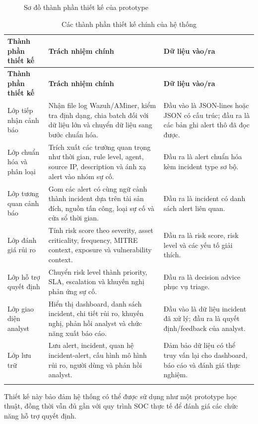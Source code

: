 \documentclass[a4paper,12pt,oneside]{book}
\begin{document}
{\begin{figure}[H]
{
}
\caption{Sơ đồ thành phần thiết kế của prototype}
\label{fig:deployment-diagram}
\end{figure}

\begin{longtable}{|L{3.5cm}|L{5.2cm}|L{5.1cm}|}
\hline
\textbf{Thành phần thiết kế} & \textbf{Trách nhiệm chính} & \textbf{Dữ liệu vào/ra} \\
\hline
\endfirsthead
\hline
\textbf{Thành phần thiết kế} & \textbf{Trách nhiệm chính} & \textbf{Dữ liệu vào/ra} \\
\hline
\endhead
Lớp tiếp nhận cảnh báo & Nhận file log Wazuh/AMiner, kiểm tra định dạng, chia batch đối với dữ liệu lớn và chuyển dữ liệu sang bước chuẩn hóa. & Đầu vào là JSON-lines hoặc JSON có cấu trúc; đầu ra là các bản ghi alert thô đã đọc được. \\
\hline
Lớp chuẩn hóa và phân loại & Trích xuất các trường quan trọng như thời gian, rule level, agent, source IP, description và ánh xạ alert vào nhóm sự cố. & Đầu ra là alert chuẩn hóa kèm incident type sơ bộ. \\
\hline
Lớp tương quan cảnh báo & Gom các alert có cùng ngữ cảnh thành incident dựa trên tài sản đích, nguồn tấn công, loại sự cố và cửa sổ thời gian. & Đầu ra là incident có danh sách alert liên quan. \\
\hline
Lớp đánh giá rủi ro & Tính risk score theo severity, asset criticality, frequency, MITRE context, exposure và vulnerability context. & Đầu ra là risk score, risk level và các yếu tố giải thích. \\
\hline
Lớp hỗ trợ quyết định & Chuyển risk level thành priority, SLA, escalation và khuyến nghị phản ứng sự cố. & Đầu ra là decision advice phục vụ triage. \\
\hline
Lớp giao diện analyst & Hiển thị dashboard, danh sách incident, chi tiết rủi ro, khuyến nghị, phản hồi analyst và chức năng xuất báo cáo. & Đầu vào là dữ liệu incident đã xử lý; đầu ra là quyết định/feedback của analyst. \\
\hline
Lớp lưu trữ & Lưu alert, incident, quan hệ incident-alert, cấu hình mô hình rủi ro, người dùng và phản hồi analyst. & Đảm bảo dữ liệu có thể truy vấn lại cho dashboard, báo cáo và đánh giá thực nghiệm. \\
\hline
\caption{Các thành phần thiết kế chính của hệ thống}\label{tab:implementation-mapping}\\
\end{longtable}

\noindent Thiết kế này bảo đảm hệ thống có thể được sử dụng như một prototype học thuật, đồng thời vẫn đủ gần với quy trình SOC thực tế để đánh giá các chức năng hỗ trợ quyết định.

}
\end{document}
